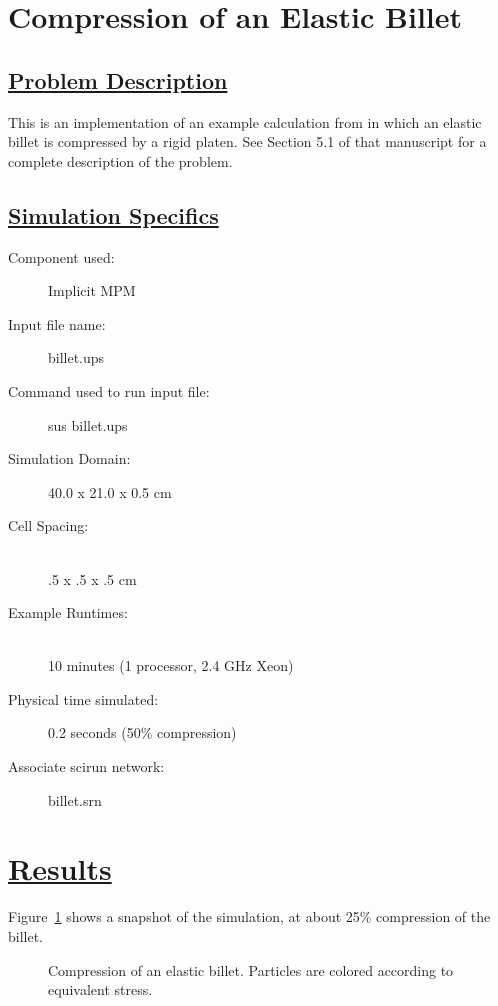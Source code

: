 \documentclass[fleqn]{article}
\begin{document}
\section*{\center Compression of an Elastic Billet}
\subsection*{\underline{Problem Description}}
This is an implementation of an example calculation from
\cite{guilkeyIMPM} in which an elastic billet is compressed by a
rigid platen.  See Section 5.1 of that manuscript for a complete description
of the problem.
 
\subsection*{\underline{Simulation Specifics}}
\begin{description} 
\item [Component used:] \hfill Implicit MPM
\item [Input file name:] \hfill billet.ups
\item [Command used to run input file:]\hfill sus billet.ups
\item [Simulation Domain:]\hfill    40.0 x 21.0 x 0.5 cm

\item [Cell Spacing:]\hfill \\ 
.5 x .5 x .5 cm

\item [Example Runtimes:] \hfill \\
 10 minutes   (1 processor, 2.4 GHz Xeon)\\

\item [Physical time simulated:] \hfill 0.2 seconds (50\% compression)

\item [Associate scirun network:] \hfill billet.srn

\end{description}

\section*{\underline{Results}}

Figure~\ref{figdisks} shows a snapshot of the simulation, at about
25\% compression of the billet.
\begin{figure}[b]
  \center
  \caption{Compression of an elastic billet.  Particles are
colored according to equivalent stress.}
  \label{figdisks}
\end{figure}


\end{document}
